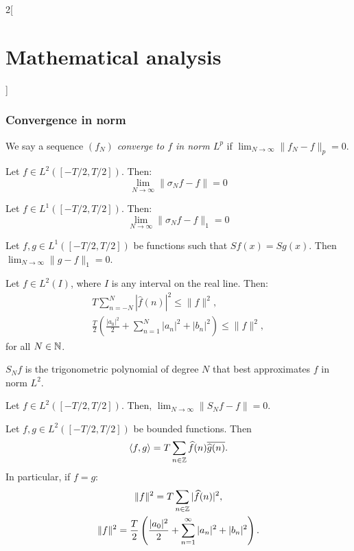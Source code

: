 \documentclass[../../../main.tex]{subfiles}
\begin{document}
\begin{multicols}{2}[\section{Mathematical analysis}]
  \subsubsection{Convergence in norm}
  \begin{definition}
    We say a sequence $(f_N)$ \textit{converge to $f$ in norm $L^p$} if $\displaystyle\lim_{N\to\infty}\|f_N-f\|_p=0$.
  \end{definition}
  \begin{theorem}
    Let $f\in L^2([-T/2,T/2])$. Then: $$\lim_{N\to\infty}\|\sigma_Nf-f\|=0$$
  \end{theorem}
  \begin{corollary}
    Let $f\in L^1([-T/2,T/2])$. Then: $$\lim_{N\to\infty}\|\sigma_Nf-f\|_1=0$$
  \end{corollary}
  \begin{corollary}
    Let $f,g\in L^1([-T/2,T/2])$ be functions such that $Sf(x)=Sg(x)$. Then $\displaystyle\lim_{N\to\infty}\|g-f\|_1=0$.
  \end{corollary}
  \begin{theorem}
    Let $f\in L^2(I)$, where $I$ is any interval on the real line. Then: \begin{gather*}T\sum_{n=-N}^N|\widehat{f}(n)|^2\leq\|f\|^2,\\\frac{T}{2}\left(\frac{|a_0|^2}{2}+\sum_{n=1}^N|a_n|^2+|b_n|^2\right)\leq \|f\|^2,\end{gather*} for all $N\in\mathbb{N} $.
  \end{theorem}
  \begin{theorem}
    $S_Nf$ is the trigonometric polynomial of degree $N$ that best approximates $f$ in norm $L^2$.
  \end{theorem}
  \begin{corollary}
    Let $f\in L^2([-T/2,T/2])$. Then, $\displaystyle\lim_{N\to\infty}\|S_Nf-f\|=0$.
  \end{corollary}
  \begin{theorem}
    Let $f,g\in L^2([-T/2,T/2])$ be bounded functions. Then $$\langle f,g\rangle=T\sum_{n\in\mathbb{Z} }\widehat{f}(n)\overline{\widehat{g}(n)}.$$
    In particular, if $f=g$:
    \begin{gather*}\|f\|^2=T\sum_{n\in\mathbb{Z} }|\widehat{f}(n)|^2,\\\|f\|^2=\frac{T}{2}\left(\frac{|a_0|^2}{2}+\sum_{n=1}^\infty|a_n|^2+|b_n|^2\right).\end{gather*}
  \end{theorem}

\end{multicols}
\end{document}
